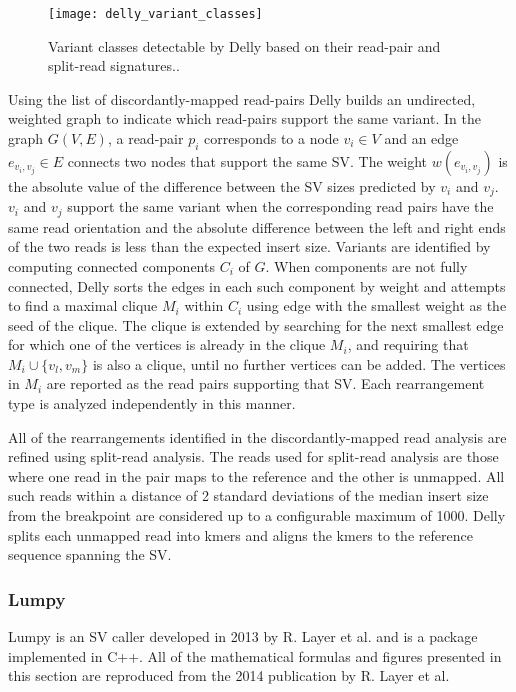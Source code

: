 \begin{figure}[H]
    \texttt{[image: delly\_variant\_classes]}
    \centering
    \caption {Variant classes detectable by Delly based on their read-pair and split-read signatures.\autocite{rausch2012delly}.}
    \label{fig:delly_variant_classes}
\end{figure}

Using the list of discordantly-mapped read-pairs Delly builds an undirected, weighted graph to indicate which read-pairs support the same variant. In the graph $G(V,E)$, a read-pair $p_i$ corresponds to a node $v_i \in V$ and an edge $e_{v_i,v_j} \in E$ connects two nodes that support the same SV. The weight $w(e_{v_i,v_j})$ is the absolute value of the difference between the SV sizes predicted by $v_i$ and $v_j$. $v_i$ and $v_j$ support the same variant when the corresponding read pairs have the same read orientation and the absolute difference between the left and right ends of the two reads is less than the expected insert size. Variants are identified by computing connected components $C_i$ of $G$. When components are not fully connected, Delly sorts the edges in each such component by weight and attempts to find a maximal clique $M_i$ within $C_i$ using edge with the smallest weight as the seed of the clique. The clique is extended by searching for the next smallest edge for which one of the vertices is already in the clique $M_i$, and requiring that $M_i \cup \{v_l,v_m\}$ is also a clique, until no further vertices can be added. The vertices in $M_i$ are reported as the read pairs supporting that SV. Each rearrangement type is analyzed independently in this manner.

All of the rearrangements identified in the discordantly-mapped read analysis are refined using split-read analysis. The reads used for split-read analysis are those where one read in the pair maps to the reference and the other is unmapped. All such reads within a distance of 2 standard deviations of the median insert size from the breakpoint are considered up to a configurable maximum of 1000. Delly splits each unmapped read into kmers and aligns the kmers to the reference sequence spanning the SV.

\subsubsection{Lumpy}

Lumpy\autocite{layer2014lumpy} is an SV caller developed in 2013 by R. Layer et al. and is a package implemented in C++. All of the mathematical formulas and figures presented in this section are reproduced from the 2014 publication by R. Layer et al. 

